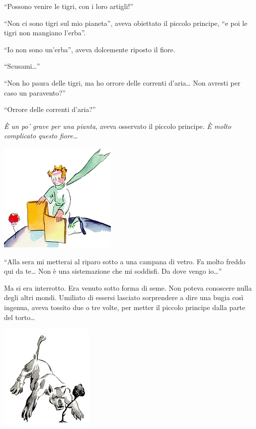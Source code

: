 \documentclass[11pt]{scrbook}
\begin{document}
``Possono venire le tigri, con i loro artigli!''

``Non ci sono tigri sul mio pianeta'', aveva obiettato il piccolo principe, ``e poi le tigri non mangiano l'erba''.

``Io non sono un'erba'', aveva dolcemente riposto il fiore.

``Scusami\ldots{}''

``Non ho paura delle tigri, ma ho orrore delle correnti d'aria\ldots{} Non avresti per caso un paravento?''

``Orrore delle correnti d'aria?''

\emph{È un po' grave per una pianta}, aveva osservato il piccolo principe. \emph{È molto complicato questo fiore\ldots{}}

\begin{center}
\includegraphics{img/8c}
\end{center}

``Alla sera mi metterai al riparo sotto a una campana di vetro. Fa molto freddo qui da te\ldots{} Non è una sistemazione che mi soddisfi. Da dove vengo io\ldots{}''

Ma si era interrotto. Era venuto sotto forma di seme. Non poteva conoscere nulla degli altri mondi. Umiliato di essersi lasciato sorprendere a dire una bugia così ingenua, aveva tossito due o tre volte, per metter il piccolo principe dalla parte del torto\ldots{}

\begin{center}
\includegraphics{img/8d}
\end{center}
\end{document}
